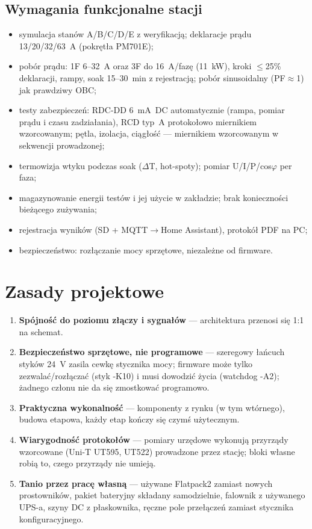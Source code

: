 \documentclass[11pt,a4paper]{article}
\begin{document}
\subsection{Wymagania funkcjonalne stacji}
\begin{itemize}
\item symulacja stanów A/B/C/D/E z weryfikacją; deklaracje prądu 13/20/32/63~A (pokrętła PM701E);
\item pobór prądu: 1F 6--32~A oraz 3F do 16~A/fazę (11~kW), kroki $\le$25\% deklaracji, rampy,
soak 15--30~min z rejestracją; pobór sinusoidalny (PF$\approx$1) jak prawdziwy OBC;
\item testy zabezpieczeń: RDC-DD 6~mA~DC automatycznie (rampa, pomiar prądu i czasu zadziałania),
RCD typ~A protokołowo miernikiem wzorcowanym; pętla, izolacja, ciągłość --- miernikiem wzorcowanym
w sekwencji prowadzonej;
\item termowizja wtyku podczas soak ($\Delta$T, hot-spoty); pomiar U/I/P/cos$\varphi$ per faza;
\item magazynowanie energii testów i jej użycie w zakładzie; brak konieczności bieżącego zużywania;
\item rejestracja wyników (SD + MQTT$\to$Home Assistant), protokół PDF na PC;
\item bezpieczeństwo: rozłączanie mocy sprzętowe, niezależne od firmware.
\end{itemize}

\section{Zasady projektowe}
\begin{enumerate}
\item \textbf{Spójność do poziomu złączy i sygnałów} --- architektura przenosi się 1:1 na schemat.
\item \textbf{Bezpieczeństwo sprzętowe, nie programowe} --- szeregowy łańcuch styków 24~V zasila
cewkę stycznika mocy; firmware może tylko zezwalać/rozłączać (styk -K10) i musi dowodzić życia
(watchdog -A2); żadnego członu nie da się zmostkować programowo.
\item \textbf{Praktyczna wykonalność} --- komponenty z rynku (w tym wtórnego), budowa etapowa,
każdy etap kończy się czymś użytecznym.
\item \textbf{Wiarygodność protokołów} --- pomiary urzędowe wykonują przyrządy wzorcowane
(Uni-T UT595, UT522) prowadzone przez stację; bloki własne robią to, czego przyrządy nie umieją.
\item \textbf{Tanio przez pracę własną} --- używane Flatpack2 zamiast nowych prostowników, pakiet
bateryjny składany samodzielnie, falownik z używanego UPS-a, szyny DC z płaskownika, ręczne pole
przełączeń zamiast stycznika konfiguracyjnego.
\end{enumerate}
\end{document}
